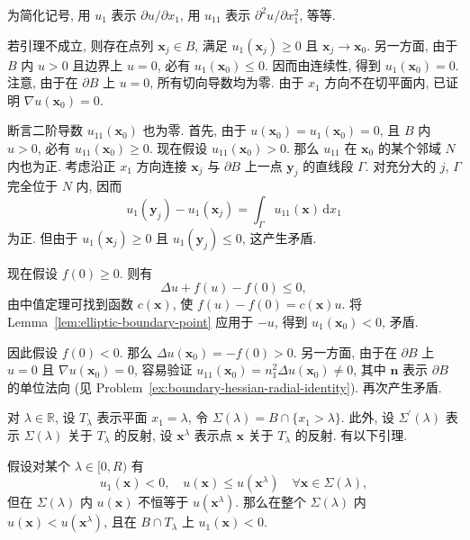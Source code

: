 \begin{Proof}
为简化记号, 用 $u_1$ 表示 $\partial u/\partial x_1$, 用 $u_{11}$ 表示 $\partial^2u/\partial x_1^2$, 等等.

若引理不成立, 则存在点列 $\bm{x}_j\in B$, 满足 $u_1(\bm{x}_j)\geq0$ 且 $\bm{x}_j\to\bm{x}_0$. 另一方面, 由于 $B$ 内 $u>0$ 且边界上 $u=0$, 必有 $u_1(\bm{x}_0)\leq0$. 因而由连续性, 得到 $u_1(\bm{x}_0)=0$. 注意, 由于在 $\partial B$ 上 $u=0$, 所有切向导数均为零. 由于 $x_1$ 方向不在切平面内, 已证明 $\nabla u(\bm{x}_0)=0$.

断言二阶导数 $u_{11}(\bm{x}_0)$ 也为零. 首先, 由于 $u(\bm{x}_0)=u_1(\bm{x}_0)=0$, 且 $B$ 内 $u>0$, 必有 $u_{11}(\bm{x}_0)\geq0$. 现在假设 $u_{11}(\bm{x}_0)>0$. 那么 $u_{11}$ 在 $\bm{x}_0$ 的某个邻域 $N$ 内也为正. 考虑沿正 $x_1$ 方向连接 $\bm{x}_j$ 与 $\partial B$ 上一点 $\bm{y}_j$ 的直线段 $\Gamma$. 对充分大的 $j$, $\Gamma$ 完全位于 $N$ 内, 因而
\begin{equation}\label{eq:radial-boundary-second-derivative-segment}
u_1(\bm{y}_j)-u_1(\bm{x}_j)=\int_\Gamma u_{11}(\bm{x})\,\mathrm{d}x_1
\end{equation}
为正. 但由于 $u_1(\bm{x}_j)\geq0$ 且 $u_1(\bm{y}_j)\leq0$, 这产生矛盾.

现在假设 $f(0)\geq0$. 则有
\begin{equation}\label{eq:radial-nonlinearity-zero-value-shift}
\Delta u+f(u)-f(0)\leq0,
\end{equation}
由中值定理可找到函数 $c(\bm{x})$, 使 $f(u)-f(0)=c(\bm{x})u$. 将 Lemma~\ref{lem:elliptic-boundary-point} 应用于 $-u$, 得到 $u_1(\bm{x}_0)<0$, 矛盾.

因此假设 $f(0)<0$. 那么 $\Delta u(\bm{x}_0)=-f(0)>0$. 另一方面, 由于在 $\partial B$ 上 $u=0$ 且 $\nabla u(\bm{x}_0)=0$, 容易验证 $u_{11}(\bm{x}_0)=n_1^2\Delta u(\bm{x}_0)\ne0$, 其中 $\bm{n}$ 表示 $\partial B$ 的单位法向 (见 Problem~\ref{ex:boundary-hessian-radial-identity}). 再次产生矛盾.
\end{Proof}

对 $\lambda\in\mathbb{R}$, 设 $T_\lambda$ 表示平面 $x_1=\lambda$, 令 $\Sigma(\lambda)=B\cap\{x_1>\lambda\}$. 此外, 设 $\Sigma^{\prime}(\lambda)$ 表示 $\Sigma(\lambda)$ 关于 $T_\lambda$ 的反射, 设 $\bm{x}^\lambda$ 表示点 $\bm{x}$ 关于 $T_\lambda$ 的反射. 有以下引理.

\begin{Lemma}
\label{lem:radial-reflection-strictness}
假设对某个 $\lambda\in[0,R)$ 有
\begin{equation}\label{eq:radial-reflection-weak-comparison}
u_1(\bm{x})<0,\quad u(\bm{x})\leq u(\bm{x}^\lambda)\quad\forall\bm{x}\in\Sigma(\lambda),
\end{equation}
但在 $\Sigma(\lambda)$ 内 $u(\bm{x})$ 不恒等于 $u(\bm{x}^\lambda)$. 那么在整个 $\Sigma(\lambda)$ 内 $u(\bm{x})<u(\bm{x}^\lambda)$, 且在 $B\cap T_\lambda$ 上 $u_1(\bm{x})<0$.
\end{Lemma}

